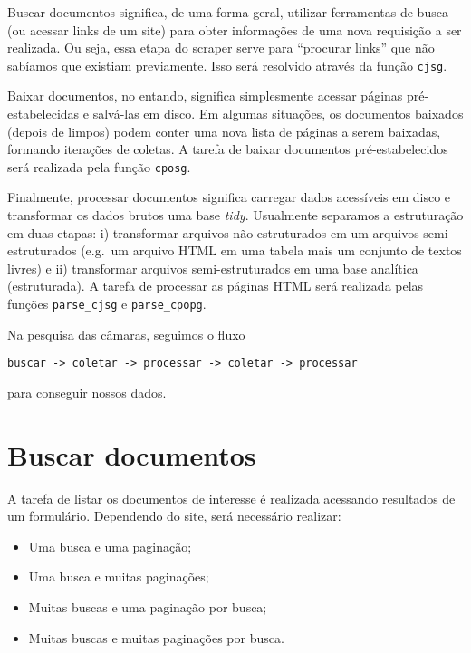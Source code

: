 \documentclass[]{book}
\providecommand{\tightlist}{%
  \setlength{\itemsep}{0pt}\setlength{\parskip}{0pt}}
\begin{document}
Buscar documentos significa, de uma forma geral, utilizar ferramentas de
busca (ou acessar links de um site) para obter informações de uma nova
requisição a ser realizada. Ou seja, essa etapa do scraper serve para
``procurar links'' que não sabíamos que existiam previamente. Isso será
resolvido através da função \texttt{cjsg}.

Baixar documentos, no entando, significa simplesmente acessar páginas
pré-estabelecidas e salvá-las em disco. Em algumas situações, os
documentos baixados (depois de limpos) podem conter uma nova lista de
páginas a serem baixadas, formando iterações de coletas. A tarefa de
baixar documentos pré-estabelecidos será realizada pela função
\texttt{cposg}.

Finalmente, processar documentos significa carregar dados acessíveis em
disco e transformar os dados brutos uma base \emph{tidy}. Usualmente
separamos a estruturação em duas etapas: i) transformar arquivos
não-estruturados em um arquivos semi-estruturados (e.g.~um arquivo HTML
em uma tabela mais um conjunto de textos livres) e ii) transformar
arquivos semi-estruturados em uma base analítica (estruturada). A tarefa
de processar as páginas HTML será realizada pelas funções
\texttt{parse\_cjsg} e \texttt{parse\_cpopg}.

Na pesquisa das câmaras, seguimos o fluxo

\begin{verbatim}
buscar -> coletar -> processar -> coletar -> processar
\end{verbatim}

para conseguir nossos dados.

\section{Buscar documentos}\label{buscar-documentos}

A tarefa de listar os documentos de interesse é realizada acessando
resultados de um formulário. Dependendo do site, será necessário
realizar:

\begin{itemize}
\tightlist
\item
  Uma busca e uma paginação;
\item
  Uma busca e muitas paginações;
\item
  Muitas buscas e uma paginação por busca;
\item
  Muitas buscas e muitas paginações por busca.
\end{itemize}
\end{document}
